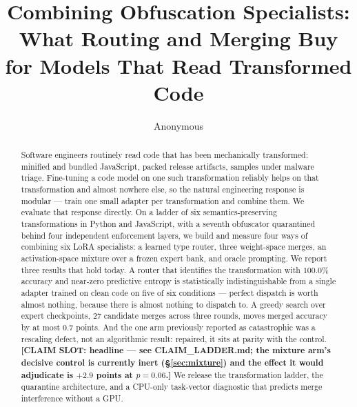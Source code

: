 \documentclass[sigconf,review,anonymous]{acmart}
\newcommand{\slot}[1]{\textbf{[CLAIM SLOT: #1]}}
\begin{document}
\title{Combining Obfuscation Specialists: What Routing and Merging
Buy for Models That Read Transformed Code}

\author{Anonymous}

\begin{abstract}
Software engineers routinely read code that has been mechanically transformed: minified and
bundled JavaScript, packed release artifacts, samples under malware triage. Fine-tuning a code
model on one such transformation reliably helps on that transformation and almost nowhere else,
so the natural engineering response is modular --- train one small adapter per transformation
and combine them. We evaluate that response directly. On a ladder of six semantics-preserving
transformations in Python and JavaScript, with a seventh obfuscator quarantined behind four
independent enforcement layers, we build and measure four ways of combining six LoRA
specialists: a learned type router, three weight-space merges, an activation-space mixture over
a frozen expert bank, and oracle prompting. We report three results that hold today. A router
that identifies the transformation with $100.0\%$ accuracy and near-zero predictive entropy is
statistically indistinguishable from a single adapter trained on clean code on five of six
conditions --- perfect dispatch is worth almost nothing, because there is almost nothing to
dispatch to. A greedy search over expert checkpoints, $27$ candidate merges across three
rounds, moves merged accuracy by at most $0.7$ points. And the one arm previously reported as
catastrophic was a rescaling defect, not an algorithmic result: repaired, it sits at parity with
the control. \slot{headline --- see CLAIM\_LADDER.md; the mixture arm's decisive control is
currently inert (\S\ref{sec:mixture}) and the effect it would adjudicate is $+2.9$ points at
$p=0.06$.} We release the transformation ladder, the quarantine architecture, and a
CPU-only task-vector diagnostic that predicts merge interference without a GPU.
\end{abstract}


\maketitle

\end{document}

